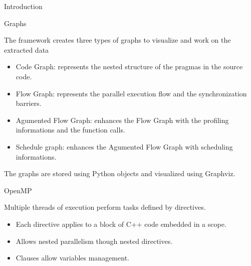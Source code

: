 \documentclass[xcolor=dvipsnames]{beamer}
\begin{document}
\begin{section}{Introduction}
\begin{frame}{\hskip 0.3cm }
\end{frame}









\begin{frame}{\hskip 0.3cm Graphs}


The framework creates three types of graphs to visualize and work on the extracted data 


\begin{itemize}		

\item Code Graph: represents the nested structure of the pragmas in the source code.

\item Flow Graph: represents the parallel execution flow and the synchronization barriers.

\item Agumented Flow Graph: enhances the Flow Graph with the profiling informations and the function calls.

\item Schedule graph: enhances the Agumented Flow Graph with scheduling informations.


\end{itemize}			

The graphs are stored using Python objects and visualized using Graphviz.



\end{frame}








\begin{frame}{\hskip 0.3cm OpenMP }

Multiple threads of execution perform tasks defined by directives.

\begin{itemize}
\item Each directive applies to  a block of C++ code embedded in a scope.

\item Allows nested parallelism though nested directives.

\item Clauses allow variables management.
\end{itemize}

\begin{block}


\end{block}
\end{frame}
\end{section}
\end{document}
